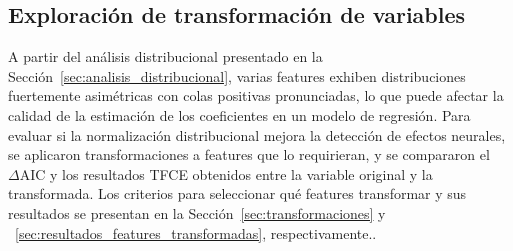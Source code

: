 \subsection{Exploración de transformación de variables}

A partir del análisis distribucional presentado en la Sección~\ref{sec:analisis_distribucional}, varias features exhiben distribuciones fuertemente asimétricas con colas positivas pronunciadas, lo que puede afectar la calidad de la estimación de los coeficientes en un modelo de regresión. Para evaluar si la normalización distribucional mejora la detección de efectos neurales, se aplicaron transformaciones a features que lo requirieran, y se compararon el $\Delta\mathrm{AIC}$ y los resultados TFCE obtenidos entre la variable original y la transformada. Los criterios para seleccionar qué features transformar y sus resultados se presentan en la Sección~\ref{sec:transformaciones} y ~\ref{sec:resultados_features_transformadas}, respectivamente..
